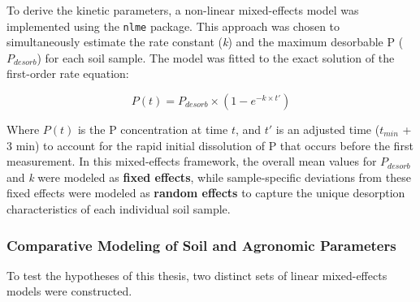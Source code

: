 \documentclass[
  a4paper,
]{article}
\begin{document}
To derive the kinetic parameters, a non-linear mixed-effects model was
implemented using the \texttt{nlme} package. This approach was chosen to
simultaneously estimate the rate constant (\emph{k}) and the maximum
desorbable P (\(P_{desorb}\)) for each soil sample. The model was fitted
to the exact solution of the first-order rate equation:

\[P(t) = P_{desorb} \times (1 - e^{-k \times t'})\]

Where \(P(t)\) is the P concentration at time \(t\), and \(t'\) is an
adjusted time (\(t_{min}\) + 3 min) to account for the rapid initial
dissolution of P that occurs before the first measurement. In this
mixed-effects framework, the overall mean values for \(P_{desorb}\) and
\emph{k} were modeled as \textbf{fixed effects}, while sample-specific
deviations from these fixed effects were modeled as \textbf{random
effects} to capture the unique desorption characteristics of each
individual soil sample.

\subsubsection{Comparative Modeling of Soil and Agronomic
Parameters}\label{comparative-modeling-of-soil-and-agronomic-parameters}

To test the hypotheses of this thesis, two distinct sets of linear
mixed-effects models were constructed.
\end{document}

